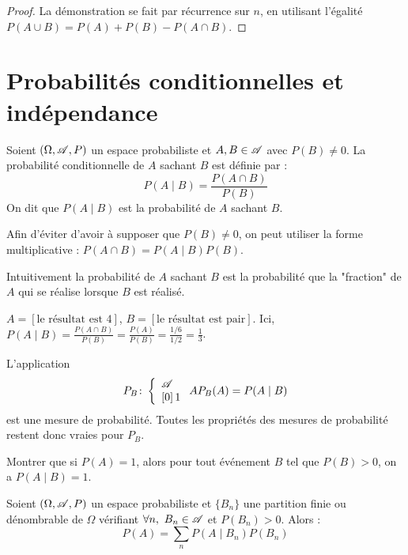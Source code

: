 \begin{proof}
    La démonstration se fait par récurrence sur $n$, en utilisant l'égalité $P(A\cup B) = P(A)+P(B) - P(A\cap B)$.
\end{proof}

\section{Probabilités conditionnelles et indépendance}

\begin{definition}
    Soient $(\Omega,\mathscr{A}, P)$ un espace probabiliste et $A,B\in \mathscr{A}$ avec $P(B)\neq 0$.
    La probabilité conditionnelle de $A$ sachant $B$ est définie par :
    \[
    P(A\mid B)=\frac{P(A\cap B)}{P(B)}
    \]
    On dit que $P(A\mid B)$ est la probabilité de $A$ sachant $B$.
\end{definition}

\begin{remarque}
    Afin d'éviter d'avoir à supposer que $P(B) \neq 0$, on peut utiliser la forme multiplicative : $P(A\cap B) = P(A\mid B)P(B)$.
\end{remarque}
   
Intuitivement la probabilité de $A$ sachant $B$ est la probabilité que la "fraction" de $A$ qui se réalise lorsque $B$ est réalisé.

\begin{exemple}[Lancer d'un dé]
    $A=[\text{le résultat est 4}]$, $B=[\text{le résultat est pair}]$. 
    Ici, $P(A\mid B)= \frac{P(A\cap B)}{P(B)} = \frac{P(A)}{P(B)}= \frac{1/6}{1/2} = \frac{1}{3}$.
\end{exemple}

\begin{remarque}
    L'application 
    \[
    P_B\colon \left\{\begin{array}{l}\mathscr{A} \\\left[ 0\right]{1}\end{array}\right.{A}{P_B(A) = P(A\mid B)}
    \]
    est une mesure de probabilité. Toutes les propriétés des mesures de probabilité restent donc vraies pour $P_B$.
\end{remarque}

\begin{exercice}
    Montrer que si $P(A)=1$, alors pour tout événement $B$ tel que $P(B)>0$, on a $P(A\mid B)=1$.
\end{exercice}

\begin{theoreme}
    Soient $(\Omega,\mathscr{A}, P)$ un espace probabiliste et $\{B_n\}$ une partition finie ou dénombrable de $\Omega$ vérifiant $\forall n,\ B_n\in \mathscr{A}$ et $P(B_n)>0$. Alors :
    \[
    P(A) = \sum_n P(A\mid B_n)P(B_n)
    \]
\end{theoreme}

